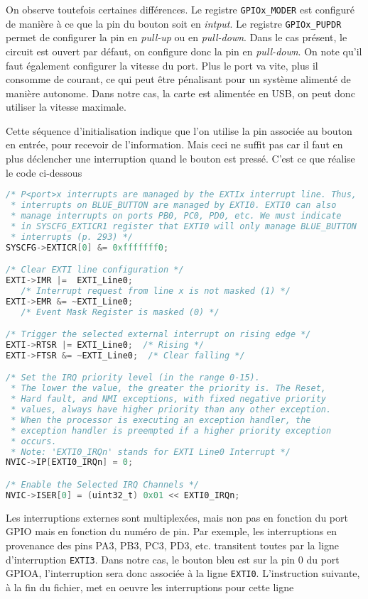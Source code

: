 \documentclass[12pt]{article}
\begin{document}
On observe toutefois certaines différences. Le registre \texttt{GPIOx\_MODER} est configuré de manière à ce que la pin du bouton soit en \emph{intput}. Le registre \texttt{GPIOx\_PUPDR} permet de configurer la pin en \emph{pull-up} ou en \emph{pull-down}. Dans le cas présent, le circuit est ouvert par défaut, on configure donc la pin en \emph{pull-down}. On note qu'il faut également configurer la vitesse du port. Plus le port va vite, plus il consomme de courant, ce qui peut être pénalisant pour un système alimenté de manière autonome. Dans notre cas, la carte est alimentée en USB, on peut donc utiliser la vitesse maximale.

Cette séquence d'initialisation indique que l'on utilise la pin associée au bouton en entrée, pour recevoir de l'information. Mais ceci ne suffit pas car il faut en plus déclencher une interruption quand le bouton est pressé. C'est ce que réalise le code ci-dessous

\begin{lstlisting}[language=C]
/* P<port>x interrupts are managed by the EXTIx interrupt line. Thus,
 * interrupts on BLUE_BUTTON are managed by EXTI0. EXTI0 can also 
 * manage interrupts on ports PB0, PC0, PD0, etc. We must indicate 
 * in SYSCFG_EXTICR1 register that EXTI0 will only manage BLUE_BUTTON 
 * interrupts (p. 293) */
SYSCFG->EXTICR[0] &= 0xfffffff0;

/* Clear EXTI line configuration */
EXTI->IMR |=  EXTI_Line0; 
   /* Interrupt request from line x is not masked (1) */
EXTI->EMR &= ~EXTI_Line0;
   /* Event Mask Register is masked (0) */

/* Trigger the selected external interrupt on rising edge */
EXTI->RTSR |= EXTI_Line0;  /* Rising */
EXTI->FTSR &= ~EXTI_Line0;  /* Clear falling */

/* Set the IRQ priority level (in the range 0-15). 
 * The lower the value, the greater the priority is. The Reset, 
 * Hard fault, and NMI exceptions, with fixed negative priority 
 * values, always have higher priority than any other exception. 
 * When the processor is executing an exception handler, the
 * exception handler is preempted if a higher priority exception 
 * occurs. 
 * Note: 'EXTI0_IRQn' stands for EXTI Line0 Interrupt */
NVIC->IP[EXTI0_IRQn] = 0;

/* Enable the Selected IRQ Channels */
NVIC->ISER[0] = (uint32_t) 0x01 << EXTI0_IRQn;
\end{lstlisting}

Les interruptions externes sont multiplexées, mais non pas en fonction du port GPIO mais en fonction du numéro de pin. Par exemple, les interruptions en provenance des pins PA3, PB3, PC3, PD3, etc. transitent toutes par la ligne d'interruption \texttt{EXTI3}. Dans notre cas, le bouton bleu est sur la pin 0 du port GPIOA, l'interruption sera donc associée à la ligne \texttt{EXTI0}. L'instruction suivante, à la fin du fichier, met en oeuvre les interruptions pour cette ligne
\end{document}
